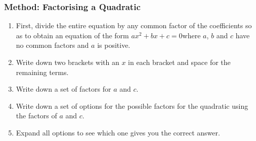            \subsubsection{ Method: Factorising a Quadratic}
            \nopagebreak
        \label{m39394*id276561}\begin{enumerate}[noitemsep, label=\textbf{\arabic*}. ] 
            \label{m39394*uid21}\item First, divide the entire equation by any common factor of the coefficients so as to obtain an equation of the form $a{x}^{2}+bx+c=0$\hspace{1ex}where $a$, $b$ and $c$ have no common factors and $a$ is positive.
\label{m39394*uid22}\item Write down two brackets with an $x$ in each bracket and space for the remaining terms.
\label{m39394*uid23}\nopagebreak\noindent{}
    \label{m39394*uid24}\item Write down a set of factors for $a$ and $c$.
\label{m39394*uid25}\item Write down a set of options for the possible factors for the quadratic using the factors of $a$ and $c$.
\label{m39394*uid26}\item Expand all options to see which one gives you the correct answer.
\end{enumerate}
